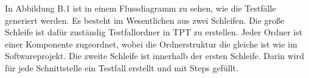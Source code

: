 In Abbildung B.1 ist in einem Flussdiagramm zu sehen, wie die Testfälle generiert werden.
Es besteht im Wesentlichen aus zwei Schleifen. Die große Schleife ist dafür zuständig Testfallordner in TPT zu
erstellen. Jeder Ordner ist einer Komponente zugeordnet, wobei die Ordnerstruktur die gleiche ist wie im Softwareprojekt.
Die zweite Schleife ist innerhalb der ersten Schleife. Darin wird für jede Schnittstelle ein Testfall erstellt und mit
Steps gefüllt.


% 







